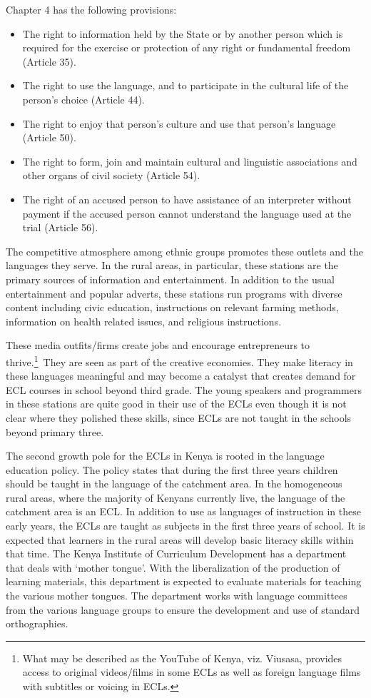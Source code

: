 \documentclass[output=paper,colorlinks,citecolor=brown]{langscibook}
\begin{document}
Chapter 4 has the following provisions:

\begin{itemize}
    \item The right to information held by the State or by another person which is required for the exercise or protection of any right or fundamental freedom (Article 35).
    \item The right to use the language, and to participate in the cultural life of the person’s choice (Article 44).
    \item The right to enjoy that person’s culture and use that person’s language (Article 50).
    \item The right to form, join and maintain cultural and linguistic associations and other organs of civil society (Article 54).
    \item The right of an accused person to have assistance of an interpreter without payment if the accused person cannot understand the language used  at the trial (Article 56).
\end{itemize}{}

The competitive atmosphere among ethnic groups promotes these outlets and the languages they serve. In the rural areas, in particular, these stations are the primary sources of information and entertainment.  In addition to the usual entertainment and popular adverts, these stations run programs with diverse content including civic education, instructions on relevant farming methods, information on health related issues, and religious instructions. 

These media outfits/firms create jobs and encourage entrepreneurs to thrive.\footnote{What may be described as the YouTube of Kenya, viz. Viusasa, provides access to original videos/films in some ECLs as well as foreign language films with subtitles or voicing in ECLs.}~They are seen as part of the creative economies. They make literacy in these languages meaningful and may become a catalyst that creates demand for ECL courses in school beyond third grade. The young speakers and programmers in these stations are quite good in their use of the ECLs even though it is not clear where they polished these skills, since ECLs are not taught in the schools beyond primary three.

The second growth pole for the ECLs in Kenya is rooted in the language education policy. The policy states that during the first three years children should be taught in the language of the catchment area. In the homogeneous rural areas, where the majority of Kenyans currently live, the language of the catchment area is an ECL. In addition to use as languages of instruction in these early years, the ECLs are taught as subjects in the first three years of school.  It is expected that learners in the rural areas will develop basic literacy skills within that time.  The Kenya Institute of Curriculum Development has a department that deals with ‘mother tongue’.  With the liberalization of the production of learning materials, this department is expected to evaluate materials for teaching the various mother tongues.  The department works with language committees from the various language groups to ensure the development and use of standard orthographies.  
\end{document}

